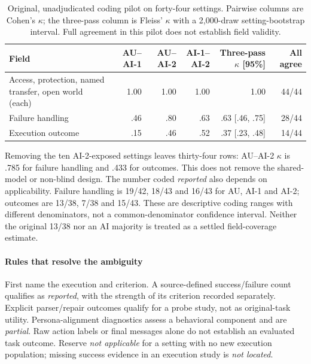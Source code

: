 \begin{table}[t]\centering\small
\caption{Original, unadjudicated coding pilot on forty-four settings. Pairwise columns are Cohen's $\kappa$; the three-pass column is Fleiss' $\kappa$ with a 2,000-draw setting-bootstrap interval. Full agreement in this pilot does not establish field validity.}\label{tab:coding-pilot}
\begin{tabularx}{\textwidth}{@{}Yrrrrr@{}}\toprule
Field & AU--AI-1 & AU--AI-2 & AI-1--AI-2 & Three-pass $\kappa$ [95\%] & All agree \\\midrule
Access, protection, named transfer, open world (each) & 1.00 & 1.00 & 1.00 & 1.00 & 44/44 \\
Failure handling & .46 & .80 & .63 & .63 [.46, .75] & 28/44 \\
Execution outcome & .15 & .46 & .52 & .37 [.23, .48] & 14/44 \\\bottomrule
\end{tabularx}\end{table}

Removing the ten AI-2-exposed settings leaves thirty-four rows: AU--AI-2 $\kappa$ is .785 for failure handling and .433 for outcomes. This does not remove the shared-model or non-blind design. The number coded \emph{reported} also depends on applicability. Failure handling is 19/42, 18/43 and 16/43 for AU, AI-1 and AI-2; outcomes are 13/38, 7/38 and 15/43. These are descriptive coding ranges with different denominators, not a common-denominator confidence interval. Neither the original 13/38 nor an AI majority is treated as a settled field-coverage estimate.

\paragraph{Rules that resolve the ambiguity}
First name the execution and criterion. A source-defined success/failure count qualifies as \emph{reported}, with the strength of its criterion recorded separately. Explicit parser/repair outcomes qualify for a probe study, not as original-task utility. Persona-alignment diagnostics assess a behavioral component and are \emph{partial}. Raw action labels or final messages alone do not establish an evaluated task outcome. Reserve \emph{not applicable} for a setting with no new execution population; missing success evidence in an execution study is \emph{not located}.

